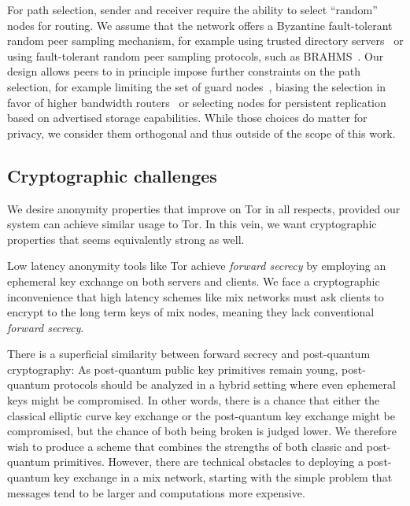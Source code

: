\documentclass[twoside,letterpaper]{llncs}
\begin{document}
For path selection, sender and receiver require the ability to select
``random'' nodes for routing.  We assume that the network offers a
Byzantine fault-tolerant random peer sampling mechanism, for example
using trusted directory servers~\cite{tordir} or using fault-tolerant
random peer sampling protocols, such as BRAHMS~\cite{brahms}.  Our
design allows peers to in principle impose further constraints on the
path selection, for example limiting the set of guard
nodes~\cite{oneguardisenough}, biasing the selection in favor of
higher bandwidth routers~\cite{findexample} or selecting nodes for
persistent replication based on advertised storage capabilities.
While those choices do matter for privacy, we consider them orthogonal
and thus outside of the scope of this work.

\subsection{Cryptographic challenges}

We desire anonymity properties that improve on Tor in all respects,
provided our system can achieve similar usage to Tor.  In this vein,
we want cryptographic properties that seems equivalently strong as well. 

Low latency anonymity tools like Tor achieve {\em forward secrecy}
by employing an ephemeral key exchange on both servers and clients.
We face a cryptographic inconvenience that high latency schemes
like mix networks must ask clients to encrypt to the long term keys
of mix nodes, meaning they lack conventional {\em forward secrecy}.  

There is a superficial similarity between forward secrecy and
post-quantum cryptography: As post-quantum public key primitives
remain young, post-quantum protocols should be analyzed in a hybrid
setting where even ephemeral keys might be compromised.  In other
words, there is a chance that either the classical elliptic curve key
exchange or the post-quantum key exchange might be compromised, but
the chance of both being broken is judged lower.  We therefore wish
to produce a scheme that combines the strengths of both classic and
post-quantum primitives.  However, there are technical obstacles to
deploying a post-quantum key exchange in a mix network, starting with
the simple problem that messages tend to be larger
and computations more expensive.
\end{document}

